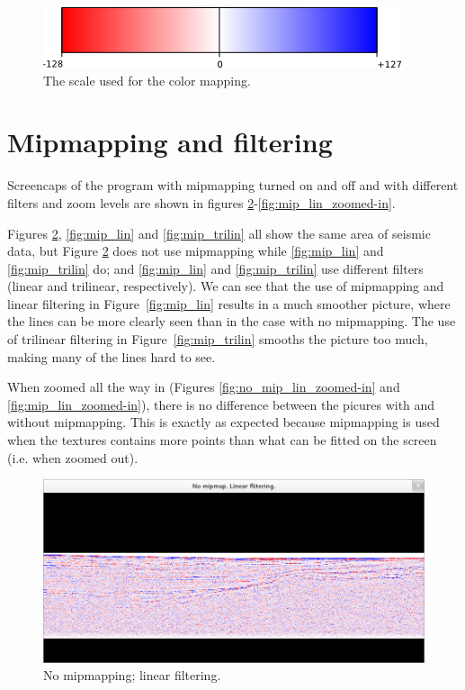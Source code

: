 \documentclass[a4paper, english, 12pt]{article}
\begin{document}
\begin{figure}[htp]
\centering
\includegraphics{graphics/scale.png}
\caption{The scale used for the color mapping.}
\label{fig:scale}
\end{figure}




\section{Mipmapping and filtering}
\label{sec:mipmap_and_filter}
Screencaps of the program with mipmapping turned on and off and with different filters and zoom levels are shown in figures \ref{fig:no_mip_lin}-\ref{fig:mip_lin_zoomed-in}. 

Figures \ref{fig:no_mip_lin}, \ref{fig:mip_lin} and \ref{fig:mip_trilin} all show the same area of seismic data, but Figure \ref{fig:no_mip_lin} does not use mipmapping while \ref{fig:mip_lin} and \ref{fig:mip_trilin} do; and \ref{fig:mip_lin} and \ref{fig:mip_trilin} use different filters (linear and trilinear, respectively). We can see that the use of mipmapping and linear filtering in Figure~\ref{fig:mip_lin} results in a much smoother picture, where the lines can be more clearly seen than in the case with no mipmapping. The use of trilinear filtering in Figure~\ref{fig:mip_trilin} smooths the picture too much, making many of the lines hard to see. 

When zoomed all the way in (Figures \ref{fig:no_mip_lin_zoomed-in} and \ref{fig:mip_lin_zoomed-in}), there is no difference between the picures with and without mipmapping. This is exactly as expected because mipmapping is used when the textures contains more points than what can be fitted on the screen (i.e. when zoomed out).


\begin{figure}[htp]
\centering
\includegraphics[clip=true, trim=10cm 5cm 10cm 6.5cm]{graphics/mip-off_linear_z0.7_x0.0_y0.0.png}
\caption{No mipmapping; linear filtering.}
\label{fig:no_mip_lin}
\end{figure}
\end{document}
